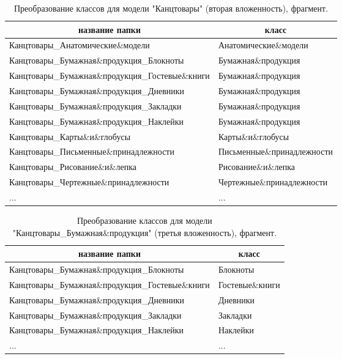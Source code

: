 \documentclass[a4paper,12pt]{extarticle}
\begin{document}
\begin{table}[ht]
	\caption{Преобразование классов для модели "Канцтовары" (вторая вложенность), фрагмент.}
	\label{table:gettarget2}
	\footnotesize
	\centering
	\begin{tabular}{ll}
		\toprule
		\multicolumn{1}{c}{название папки} & \multicolumn{1}{c}{класс}\\
		\midrule
		Канцтовары\_Анатомические\&модели & Анатомические\&модели\\  Канцтовары\_Бумажная\&продукция\_Блокноты & Бумажная\&продукция\\
		Канцтовары\_Бумажная\&продукция\_Гостевые\&книги & Бумажная\&продукция\\
		Канцтовары\_Бумажная\&продукция\_Дневники & Бумажная\&продукция\\
		Канцтовары\_Бумажная\&продукция\_Закладки & Бумажная\&продукция\\
		Канцтовары\_Бумажная\&продукция\_Наклейки & Бумажная\&продукция\\
		Канцтовары\_Карты\&и\&глобусы & Карты\&и\&глобусы\\
		Канцтовары\_Письменные\&принадлежности & Письменные\&принадлежности\\
		Канцтовары\_Рисование\&и\&лепка & Рисование\&и\&лепка\\
		Канцтовары\_Чертежные\&принадлежности & Чертежные\&принадлежности\\
		... & ...\\
		\bottomrule
	\end{tabular}
\end{table}

\begin{table}[ht]
	\caption{Преобразование классов для модели \\ "Канцтовары\_Бумажная\&продукция" (третья вложенность), фрагмент.}
	\label{table:gettarget3}
	\footnotesize
	\centering
	\begin{tabular}{ll}
		\toprule
		\multicolumn{1}{c}{название папки} & \multicolumn{1}{c}{класс}\\
		\midrule
		Канцтовары\_Бумажная\&продукция\_Блокноты & Блокноты\\
		Канцтовары\_Бумажная\&продукция\_Гостевые\&книги & Гостевые\&книги\\
		Канцтовары\_Бумажная\&продукция\_Дневники & Дневники\\
		Канцтовары\_Бумажная\&продукция\_Закладки & Закладки\\
		Канцтовары\_Бумажная\&продукция\_Наклейки & Наклейки\\
		... & ...\\
		\bottomrule
	\end{tabular}
\end{table}
\end{document}
